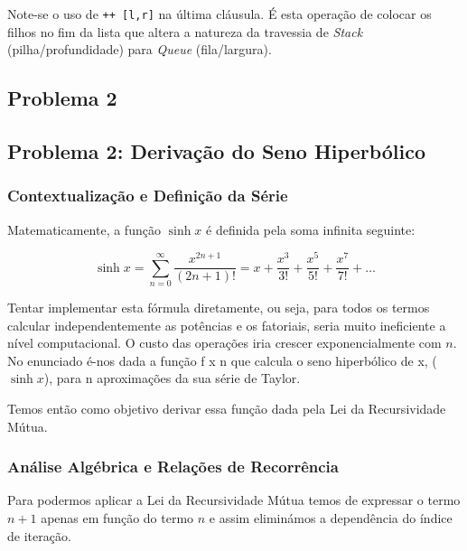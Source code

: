 \documentclass[11pt, a4paper, fleqn]{article}
\begin{document}
\noindent Note-se o uso de \texttt{++ [l,r]} na última cláusula.
É esta operação de colocar os filhos no fim da lista que altera a natureza da travessia de \textit{Stack} (pilha/profundidade) para \textit{Queue} (fila/largura).


\subsection*{Problema 2}

\subsection*{Problema 2: Derivação do Seno Hiperbólico}


\subsubsection*{Contextualização e Definição da Série}

\noindent Matematicamente, a função $\sinh x$ é definida pela soma infinita seguinte:

\begin{equation*}
\sinh x = \sum_{n=0}^{\infty} \frac{x^{2n+1}}{(2n+1)!} = x + \frac{x^3}{3!} + \frac{x^5}{5!} + \frac{x^7}{7!} + \dots
\end{equation*}

\noindent Tentar implementar esta fórmula diretamente, ou seja, para todos os termos calcular independentemente as potências e os fatoriais, seria muito ineficiente a nível computacional.
O custo das operações iria crescer exponencialmente com $n$.
No enunciado é-nos dada a função f x n que calcula o seno hiperbólico de x, ($\sinh x$), para n aproximações da sua série de Taylor.

\noindent Temos então como objetivo derivar essa função dada pela Lei da Recursividade Mútua.

\subsubsection*{Análise Algébrica e Relações de Recorrência}

\noindent Para podermos aplicar a Lei da Recursividade Mútua temos de expressar o termo $n+1$ apenas em função do termo $n$ e assim eliminámos a dependência do índice de iteração.
\end{document}

